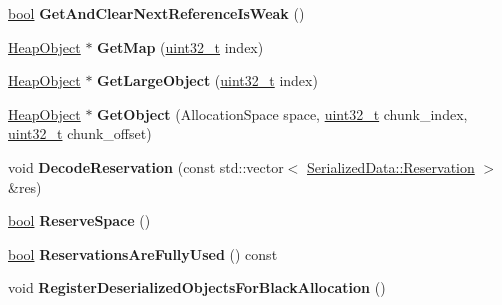 \begin{DoxyCompactItemize}
\mbox{\hyperlink{classbool}{bool}} {\bfseries Get\+And\+Clear\+Next\+Reference\+Is\+Weak} ()
\item 
\mbox{\label{classv8_1_1internal_1_1DeserializerAllocator_ac3f1da3872bc524c054867759d3d6f63}} 
\mbox{\hyperlink{classv8_1_1internal_1_1HeapObject}{Heap\+Object}} $\ast$ {\bfseries Get\+Map} (\mbox{\hyperlink{classuint32__t}{uint32\+\_\+t}} index)
\item 
\mbox{\label{classv8_1_1internal_1_1DeserializerAllocator_a959047e965b35324b8071eb4d9e7dd94}} 
\mbox{\hyperlink{classv8_1_1internal_1_1HeapObject}{Heap\+Object}} $\ast$ {\bfseries Get\+Large\+Object} (\mbox{\hyperlink{classuint32__t}{uint32\+\_\+t}} index)
\item 
\mbox{\label{classv8_1_1internal_1_1DeserializerAllocator_a3b8d1ff711d660b380f666c85ae9684f}} 
\mbox{\hyperlink{classv8_1_1internal_1_1HeapObject}{Heap\+Object}} $\ast$ {\bfseries Get\+Object} (Allocation\+Space space, \mbox{\hyperlink{classuint32__t}{uint32\+\_\+t}} chunk\+\_\+index, \mbox{\hyperlink{classuint32__t}{uint32\+\_\+t}} chunk\+\_\+offset)
\item 
\mbox{\label{classv8_1_1internal_1_1DeserializerAllocator_af321b71722edaf0dedc109c67b41e383}} 
void {\bfseries Decode\+Reservation} (const std\+::vector$<$ \mbox{\hyperlink{classv8_1_1internal_1_1SerializedData_1_1Reservation}{Serialized\+Data\+::\+Reservation}} $>$ \&res)
\item 
\mbox{\label{classv8_1_1internal_1_1DeserializerAllocator_ab810742fd6d1907dc16216ba2c8fbb03}} 
\mbox{\hyperlink{classbool}{bool}} {\bfseries Reserve\+Space} ()
\item 
\mbox{\label{classv8_1_1internal_1_1DeserializerAllocator_a89e39cc9bcf64ad9bdf7bffef1eb833b}} 
\mbox{\hyperlink{classbool}{bool}} {\bfseries Reservations\+Are\+Fully\+Used} () const
\item 
\mbox{\label{classv8_1_1internal_1_1DeserializerAllocator_ab40a6a9e188312eae38f387a8ad2f674}} 
void {\bfseries Register\+Deserialized\+Objects\+For\+Black\+Allocation} ()
\end{DoxyCompactItemize}


